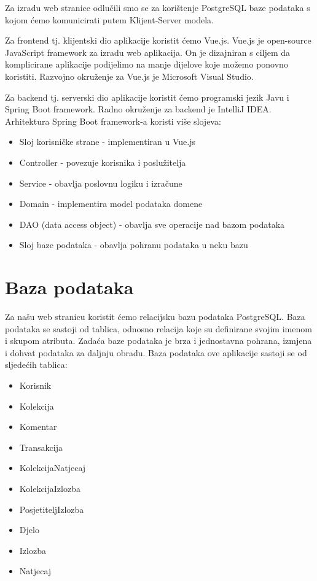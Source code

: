 		Za izradu web stranice odlučili smo se za korištenje PostgreSQL baze podataka s kojom ćemo komunicirati putem Klijent-Server modela.
		
		Za frontend tj. klijentski  dio aplikacije koristit ćemo Vue.js. Vue.js je open-source JavaScript framework za izradu web aplikacija. On je dizajniran s ciljem da komplicirane aplikacije podijelimo na manje dijelove koje možemo ponovno koristiti. Razvojno okruženje za Vue.js je Microsoft Visual Studio.
		
		Za backend tj. serverski dio aplikacije koristit ćemo programski jezik Javu i Spring Boot framework. Radno okruženje za backend je IntelliJ IDEA.
		\newline
		Arhitektura Spring Boot framework-a koristi više slojeva:
		
		\begin{itemize}
			\item Sloj korisničke strane - implementiran u Vue.js
			\item Controller - povezuje korisnika i poslužitelja
			\item Service - obavlja poslovnu logiku i izračune
			\item Domain - implementira model podataka domene
			\item DAO (data access object) - obavlja sve operacije nad bazom podataka 
			\item Sloj baze podataka - obavlja pohranu podataka u neku bazu
		\end{itemize}

		

				
		\section{Baza podataka}
			
			Za našu web stranicu koristit ćemo relacijsku bazu podataka PostgreSQL. Baza podataka se sastoji od tablica, odnosno relacija koje su definirane svojim imenom i skupom atributa. Zadaća baze podataka je brza i jednostavna pohrana, izmjena i dohvat podataka za daljnju obradu. \newline Baza podataka ove aplikacije sastoji se od sljedećih tablica:
			\begin{itemize}
				\item Korisnik
				\item Kolekcija
				\item Komentar
				\item Transakcija
				\item KolekcijaNatjecaj
				\item KolekcijaIzlozba
				\item PosjetiteljIzlozba
				\item Djelo
				\item Izlozba
				\item Natjecaj
				
			\end{itemize}
		
